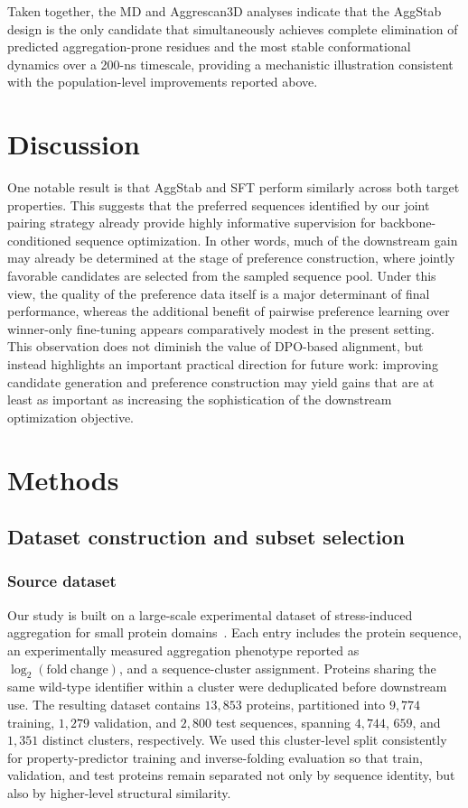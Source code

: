 \documentclass[pdflatex,sn-mathphys-num]{sn-jnl}%
\theoremstyle{thmstyleone}%
\theoremstyle{thmstyletwo}%
\theoremstyle{thmstylethree}%
\begin{document}
Taken together, the MD and Aggrescan3D analyses indicate that the AggStab design is the only candidate that simultaneously achieves complete elimination of predicted aggregation-prone residues and the most stable conformational dynamics over a 200-ns timescale, providing a mechanistic illustration consistent with the population-level improvements reported above.
\section{Discussion}\label{sec3}
One notable result is that AggStab and SFT perform similarly across both target properties. This suggests that the preferred sequences identified by our joint pairing strategy already provide highly informative supervision for backbone-conditioned sequence optimization. In other words, much of the downstream gain may already be determined at the stage of preference construction, where jointly favorable candidates are selected from the sampled sequence pool. Under this view, the quality of the preference data itself is a major determinant of final performance, whereas the additional benefit of pairwise preference learning over winner-only fine-tuning appears comparatively modest in the present setting. This observation does not diminish the value of DPO-based alignment, but instead highlights an important practical direction for future work: improving candidate generation and preference construction may yield gains that are at least as important as increasing the sophistication of the downstream optimization objective.

\section{Methods}\label{sec4}
\subsection{Dataset construction and subset selection}\label{sec:dataset}

\subsubsection*{Source dataset}

Our study is built on a large-scale experimental dataset of stress-induced aggregation for small protein domains~\cite{example2026}. Each entry includes the protein sequence, an experimentally measured aggregation phenotype reported as $\log_2(\mathrm{fold\ change})$, and a sequence-cluster assignment. Proteins sharing the same wild-type identifier within a cluster were deduplicated before downstream use. The resulting dataset contains $13{,}853$ proteins, partitioned into $9{,}774$ training, $1{,}279$ validation, and $2{,}800$ test sequences, spanning $4{,}744$, $659$, and $1{,}351$ distinct clusters, respectively. We used this cluster-level split consistently for property-predictor training and inverse-folding evaluation so that train, validation, and test proteins remain separated not only by sequence identity, but also by higher-level structural similarity.
\end{document}
